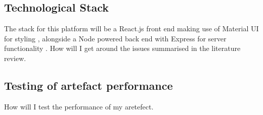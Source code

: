 \documentclass[lettersize,journal]{IEEEtran}
\begin{document}
	\subsection{Technological Stack}
	The stack for this platform will be a React.js front end \cite{React} making use of Material UI for styling \cite{Mui}, alongside a Node powered back end \cite{Node} with Express for server functionality\cite{Express} . 
	How will I get around the issues summarised in the literature review.
	\subsection{Testing of artefact performance}
	How will I test the performance of my aretefect.







%
%
%
\end{document}
